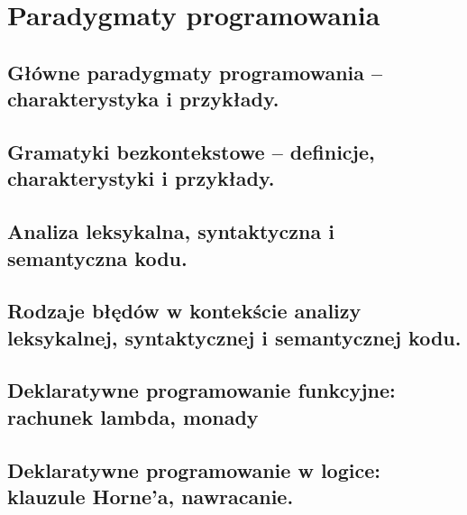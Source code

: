 \chapter{Paradygmaty programowania}
\section{Główne paradygmaty programowania – charakterystyka i przykłady.}
\section{Gramatyki bezkontekstowe – definicje, charakterystyki i przykłady.}
\section{Analiza leksykalna, syntaktyczna i semantyczna kodu. }
\section{Rodzaje błędów w kontekście analizy leksykalnej, syntaktycznej i semantycznej kodu.}
\section{Deklaratywne programowanie funkcyjne: rachunek lambda, monady}
\section{Deklaratywne programowanie w logice: klauzule Horne'a, nawracanie.}
